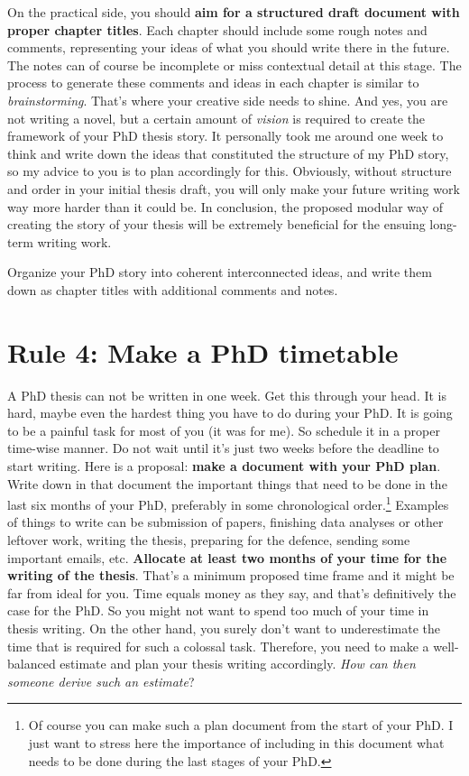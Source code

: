 \documentclass[
  12pt,
  oneside]{book}
\begin{document}
On the practical side, you should \textbf{aim for a structured draft document with proper chapter titles}.
Each chapter should include some rough notes and comments, representing your ideas of what you should write there in the future.
The notes can of course be incomplete or miss contextual detail at this stage.
The process to generate these comments and ideas in each chapter is similar to \emph{brainstorming}.
That's where your creative side needs to shine.
And yes, you are not writing a novel, but a certain amount of \emph{vision} is required to create the framework of your PhD thesis story.
It personally took me around one week to think and write down the ideas that constituted the structure of my PhD story, so my advice to you is to plan accordingly for this.
Obviously, without structure and order in your initial thesis draft, you will only make your future writing work way more harder than it could be.
In conclusion, the proposed modular way of creating the story of your thesis will be extremely beneficial for the ensuing long-term writing work.

Organize your PhD story into coherent interconnected ideas, and write them down as chapter titles with additional comments and notes.

\hypertarget{rule4}{%
\section*{\texorpdfstring{\textbf{Rule 4:} Make a PhD timetable}{Rule 4: Make a PhD timetable}}\label{rule4}}

A PhD thesis can not be written in one week.
Get this through your head.
It is hard, maybe even the hardest thing you have to do during your PhD.
It is going to be a painful task for most of you (it was for me).
So schedule it in a proper time-wise manner.
Do not wait until it's just two weeks before the deadline to start writing.
Here is a proposal: \textbf{make a document with your PhD plan}.
Write down in that document the important things that need to be done in the last six months of your PhD, preferably in some chronological order.\footnote{Of course you can make such a plan document from the start of your PhD. I just want to stress here the importance of including in this document what needs to be done during the last stages of your PhD.}
Examples of things to write can be submission of papers, finishing data analyses or other leftover work, writing the thesis, preparing for the defence, sending some important emails, etc.
\textbf{Allocate at least two months of your time for the writing of the thesis}.
That's a minimum proposed time frame and it might be far from ideal for you.
Time equals money as they say, and that's definitively the case for the PhD.
So you might not want to spend too much of your time in thesis writing.
On the other hand, you surely don't want to underestimate the time that is required for such a colossal task.
Therefore, you need to make a well-balanced estimate and plan your thesis writing accordingly.
\emph{How can then someone derive such an estimate}?
\end{document}
